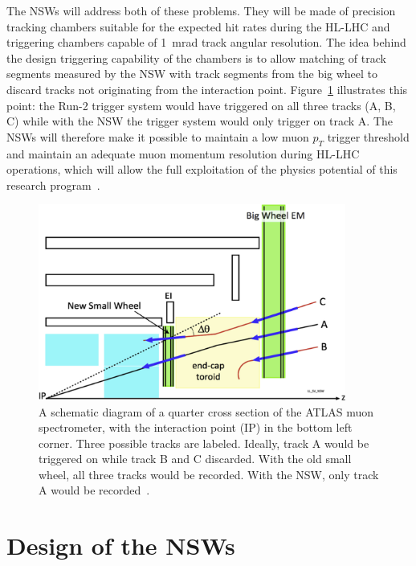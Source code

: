 The NSWs will address both of these problems. They will be made of precision tracking chambers suitable for the expected hit rates during the HL-LHC and triggering chambers capable of \SI{1}{mrad} track angular resolution. The idea behind the design triggering capability of the chambers is to allow matching of track segments measured by the NSW with track segments from the big wheel to discard tracks not originating from the interaction point. Figure~\ref{fig:nsw_track_triggering} illustrates this point: the Run-2 trigger system would have triggered on all three tracks (A, B, C) while with the NSW the trigger system would only trigger on track A. The NSWs will therefore make it possible to maintain a low muon $p_T$ trigger threshold and maintain an adequate muon momentum resolution during HL-LHC operations, which will allow the full exploitation of the physics potential of this research program~\cite{nsw_tdr}.

\begin{figure}
    \centering
    \includegraphics[width = 0.9\textwidth]{figures/perez-codina_NSW_tracks.jpg}
    \caption{A schematic diagram of a quarter cross section of the ATLAS muon spectrometer, with the interaction point (IP) in the bottom left corner. Three possible tracks are labeled. Ideally, track A would be triggered on while track B and C discarded. With the old small wheel, all three tracks would be recorded. With the NSW, only track A would be recorded~\cite{nsw_tdr}.}
    \label{fig:nsw_track_triggering}
\end{figure}

\section{Design of the NSWs}

